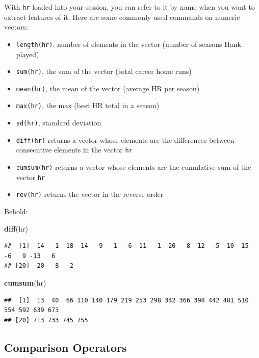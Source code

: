 \documentclass[
]{book}
\newenvironment{Shaded}{\begin{snugshade}}{\end{snugshade}}
\newcommand{\FunctionTok}[1]{\textcolor[rgb]{0.13,0.29,0.53}{\textbf{#1}}}
\newcommand{\NormalTok}[1]{#1}
\providecommand{\tightlist}{%
  \setlength{\itemsep}{0pt}\setlength{\parskip}{0pt}}
\theoremstyle{definition}
\theoremstyle{definition}
\theoremstyle{definition}
\theoremstyle{definition}
\theoremstyle{remark}
\begin{document}
With \texttt{hr} loaded into your session, you can refer to it by name when you want to extract features of it. Here are some commonly used commands on numeric vectors:

\begin{itemize}
\tightlist
\item
  \texttt{length(hr)}, number of elements in the vector (number of seasons Hank played)
\item
  \texttt{sum(hr)}, the sum of the vector (total career home runs)
\item
  \texttt{mean(hr)}, the mean of the vector (average HR per season)
\item
  \texttt{max(hr)}, the max (best HR total in a season)
\item
  \texttt{sd(hr)}, standard deviation
\item
  \texttt{diff(hr)} returns a vector whose elements are the differences between consecutive elements in the vector \texttt{hr}
\item
  \texttt{cumsum(hr)} returns a vector whose elements are the cumulative sum of the vector \texttt{hr}
\item
  \texttt{rev(hr)} returns the vector in the reverse order
\end{itemize}

Behold:

\begin{Shaded}
\begin{Highlighting}[]
\FunctionTok{diff}\NormalTok{(hr)}
\end{Highlighting}
\end{Shaded}

\begin{verbatim}
##  [1]  14  -1  18 -14   9   1  -6  11  -1 -20   8  12  -5 -10  15  -6   9 -13   6
## [20] -20  -8  -2
\end{verbatim}

\begin{Shaded}
\begin{Highlighting}[]
\FunctionTok{cumsum}\NormalTok{(hr)}
\end{Highlighting}
\end{Shaded}

\begin{verbatim}
##  [1]  13  40  66 110 140 179 219 253 298 342 366 398 442 481 510 554 592 639 673
## [20] 713 733 745 755
\end{verbatim}

\subsection{Comparison Operators}\label{comparison-operators}
\end{document}
